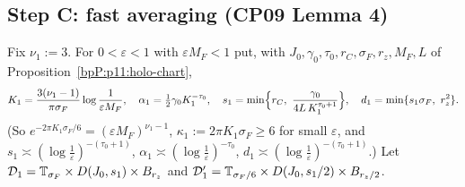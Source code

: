\subsection{Step C: fast averaging (CP09 Lemma 4)}\label{bpP:p11:sec-C}

Fix $\nu_1:=3$. For $0<\varepsilon<1$ with $\varepsilon M_F<1$ put, with $J_0,\gamma_0,\tau_0,r_C,\sigma_F,r_z,M_F,L$ of Proposition~\ref{bpP:p11:holo-chart},
\begin{equation}\label{bpP:p11:eq:par1}
K_1=\frac{3(\nu_1-1)}{\pi\sigma_F}\log\frac1{\varepsilon M_F},\quad\alpha_1=\tfrac12\gamma_0K_1^{-\tau_0},\quad s_1=\min\Bigl\{r_C,\ \frac{\gamma_0}{4L\,K_1^{\tau_0+1}}\Bigr\},\quad d_1=\min\{s_1\sigma_F,\ r_z^2\}.
\end{equation}
(So $e^{-2\pi K_1\sigma_F/6}=(\varepsilon M_F)^{\nu_1-1}$, $\kappa_1:=2\pi K_1\sigma_F\ge6$ for small $\varepsilon$, and $s_1\asymp(\log\frac1\varepsilon)^{-(\tau_0+1)}$, $\alpha_1\asymp(\log\frac1\varepsilon)^{-\tau_0}$, $d_1\asymp(\log\frac1\varepsilon)^{-(\tau_0+1)}$.) Let $\mathcal D_1=\mathbb{T}_{\sigma_F}\times D(J_0,s_1)\times B_{r_z}$ and $\mathcal D_1'=\mathbb{T}_{\sigma_F/6}\times D(J_0,s_1/2)\times B_{r_z/2}$.

